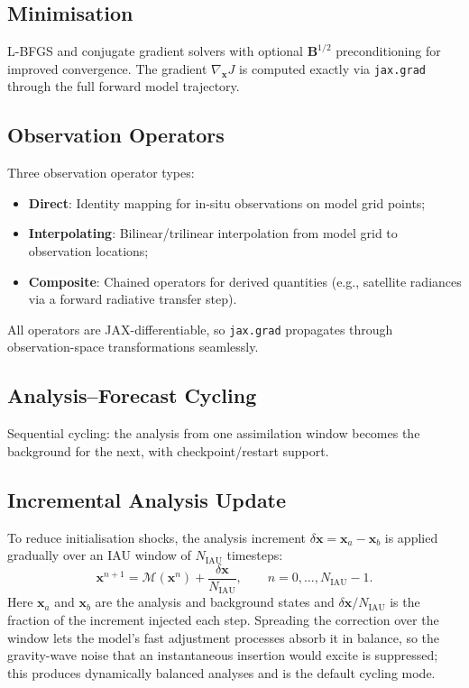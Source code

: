 \documentclass[11pt,twoside]{report}
\newcommand{\vect}[1]{\bm{#1}}
\newcommand{\grad}{\nabla}
\begin{document}
\subsection{Minimisation}

L-BFGS and conjugate gradient solvers with optional
$\mathbf{B}^{1/2}$ preconditioning for improved convergence.
The gradient $\grad_{\vect{x}}J$ is computed exactly via
\texttt{jax.grad} through the full forward model trajectory.

\subsection{Observation Operators}

Three observation operator types:
\begin{itemize}[nosep]
  \item \textbf{Direct}: Identity mapping for in-situ observations on model
    grid points;
  \item \textbf{Interpolating}: Bilinear/trilinear interpolation from model
    grid to observation locations;
  \item \textbf{Composite}: Chained operators for derived quantities
    (e.g., satellite radiances via a forward radiative transfer step).
\end{itemize}
All operators are JAX-differentiable, so \texttt{jax.grad} propagates
through observation-space transformations seamlessly.

\subsection{Analysis--Forecast Cycling}

Sequential cycling: the analysis from one assimilation window becomes the
background for the next, with checkpoint/restart support.

\subsection{Incremental Analysis Update}

To reduce initialisation shocks, the analysis increment
$\delta\vect{x}=\vect{x}_a-\vect{x}_b$ is applied gradually over an
IAU window of $N_{\mathrm{IAU}}$ timesteps:
\begin{equation}
  \vect{x}^{n+1} = \mathcal{M}(\vect{x}^n) + \frac{\delta\vect{x}}{N_{\mathrm{IAU}}},
  \qquad n = 0,\ldots,N_{\mathrm{IAU}}-1.
\end{equation}
Here $\vect{x}_a$ and $\vect{x}_b$ are the analysis and background states and
$\delta\vect{x}/N_{\mathrm{IAU}}$ is the fraction of the increment injected each
step.  Spreading the correction over the window lets the model's fast adjustment
processes absorb it in balance, so the gravity-wave noise that an instantaneous
insertion would excite is suppressed; this produces dynamically balanced
analyses and is the default cycling mode.
\end{document}
